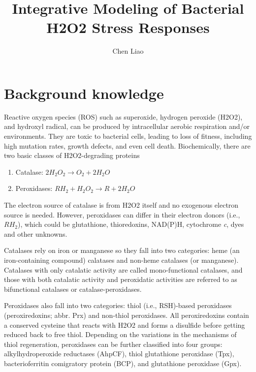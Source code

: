 \documentclass[10pt]{article}
\begin{document}
\title{Integrative Modeling of Bacterial H2O2 Stress Responses}
\author{Chen Liao}

\maketitle
\tableofcontents


\clearpage
\section{Background knowledge}

Reactive oxygen species (ROS) such as superoxide, hydrogen peroxide (H2O2), and hydroxyl radical, can be produced by intracellular aerobic respiration and/or environments. They are toxic to bacterial cells, leading to loss of fitness, including high mutation rates, growth defects, and even cell death. Biochemically, there are two basic classes of H2O2-degrading proteins
\begin{enumerate}
\centering
\item{Catalase: $2H_2O_2 \rightarrow O_2+2H_2O$}
\item{Peroxidases: $RH_2+H_2O_2 \rightarrow R+2H_2O$}
\end{enumerate}
The electron source of catalase is from H2O2 itself and no exogenous electron source is needed. However, peroxidases can differ in their electron donors (i.e., $RH_2$), which could be glutathione, thioredoxins, NAD(P)H, cytochrome \textit{c}, dyes and other unknowns. 

Catalases rely on iron or manganese so they fall into two categories: heme (an iron-containing compound) calatases and non-heme catalases (or manganese). Catalases with only catalatic activity are called mono-functional catalases, and those with both catalatic activity and peroxidatic activities are referred to as bifunctional catalases or catalase-peroxidases.

Peroxidases also fall into two categories: thiol (i.e., RSH)-based peroxidases (peroxiredoxins; abbr. Prx) and non-thiol peroxidases. All peroxiredoxins contain a conserved cysteine that reacts with H2O2 and forms a disulfide before getting reduced back to free thiol. Depending on the variations in the mechanisms of thiol regeneration, peroxidases can be further classified into four groups: alkylhydroperoxide reductases (AhpCF), thiol glutathione peroxidase (Tpx), bacterioferritin comigratory protein (BCP), and glutathione peroxidase (Gpx). 
\end{document}
